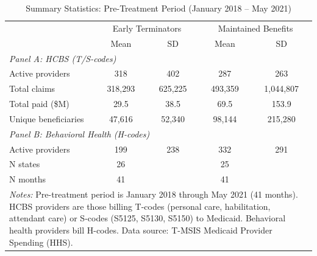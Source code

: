 \begin{table}[htbp]
\centering
\caption{Summary Statistics: Pre-Treatment Period (January 2018 -- May 2021)}
\label{tab:summary_stats}
\begin{tabular}{lcccc}
\hline\hline
 & \multicolumn{2}{c}{Early Terminators} & \multicolumn{2}{c}{Maintained Benefits} \\
 & Mean & SD & Mean & SD \\
\hline
\multicolumn{5}{l}{\textit{Panel A: HCBS (T/S-codes)}} \\
Active providers & 318 & 402 & 287 & 263 \\
Total claims & 318,293 & 625,225 & 493,359 & 1,044,807 \\
Total paid (\$M) & 29.5 & 38.5 & 69.5 & 153.9 \\
Unique beneficiaries & 47,616 & 52,340 & 98,144 & 215,280 \\
\hline
\multicolumn{5}{l}{\textit{Panel B: Behavioral Health (H-codes)}} \\
Active providers & 199 & 238 & 332 & 291 \\
\hline
N states & 26 & & 25 & \\
N months & 41 & & 41 & \\
\hline\hline
\multicolumn{5}{p{12cm}}{\footnotesize \textit{Notes:} Pre-treatment period is January 2018 through May 2021 (41 months). HCBS providers are those billing T-codes (personal care, habilitation, attendant care) or S-codes (S5125, S5130, S5150) to Medicaid. Behavioral health providers bill H-codes. Data source: T-MSIS Medicaid Provider Spending (HHS).} \\
\end{tabular}
\end{table}

